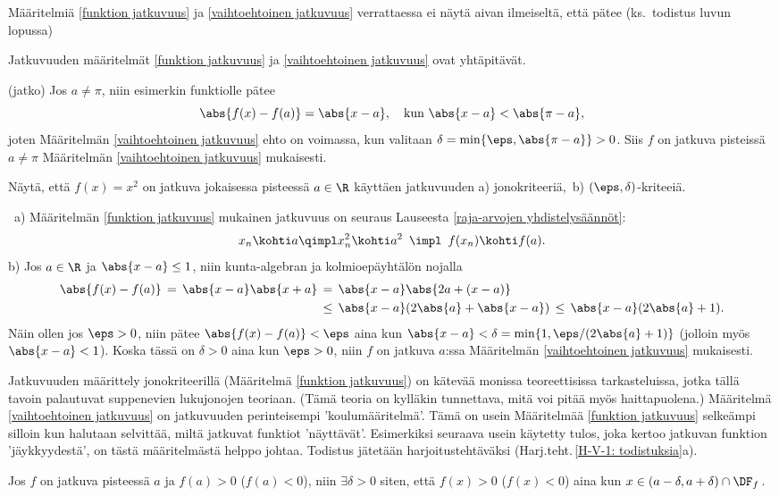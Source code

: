 Määritelmiä \ref{funktion jatkuvuus} ja \ref{vaihtoehtoinen jatkuvuus} verrattaessa ei näytä
aivan ilmeiseltä, että pätee (ks.\ todistus luvun lopussa)
\begin{*Lause} \label{jatkuvuuskriteerien yhtäpitävyys} Jatkuvuuden määritelmät
\ref{funktion jatkuvuus} ja \ref{vaihtoehtoinen jatkuvuus} ovat yhtäpitävät.
\end{*Lause} 
\jatko\jatko \begin{Exa} (jatko) Jos $a\neq\pi$, niin esimerkin funktiolle pätee
\[
\abs{f(x)-f(a)}=\abs{x-a}, \quad \text{kun}\ \abs{x-a}<\abs{\pi-a},
\]
joten Määritelmän \ref{vaihtoehtoinen jatkuvuus} ehto on voimassa, kun valitaan
$\delta=\min\{\eps,\abs{\pi-a}\}>0$. Siis $f$ on jatkuva pisteissä $a\neq\pi$ Määritelmän
\ref{vaihtoehtoinen jatkuvuus} mukaisesti. \loppu
\end{Exa} \seur
\begin{Exa} Näytä, että $f(x)=x^2$ on jatkuva jokaisessa pisteessä $a\in\R$
käyttäen jatkuvuuden a) jonokriteeriä,\, b) $(\eps,\delta)$-kriteeiä.
\end{Exa}
\ratk \ a) Määritelmän \ref{funktion jatkuvuus} mukainen jatkuvuus on seuraus Lauseesta
\ref{raja-arvojen yhdistelysäännöt}:
\[
x_n \kohti a \qimpl x_n^2 \kohti a^2\,\ \impl\,\ f(x_n) \kohti f(a).
\]
b) Jos $a\in\R$ ja $\abs{x-a} \le 1$, niin kunta-algebran ja kolmioepäyhtälön nojalla
\begin{align*}
\abs{f(x)-f(a)}\,=\,\abs{x-a}\abs{x+a}\,
                &=\,\abs{x-a}\abs{2a+(x-a)} \\
                &\le\,\abs{x-a}(2\abs{a}+\abs{x-a})\,
                 \le\,\abs{x-a}(2\abs{a}+1).
\end{align*}
Näin ollen jos $\eps>0$, niin pätee $\abs{f(x)-f(a)}<\eps$ aina kun
$\abs{x-a}<\delta=\min\{1,\eps/(2\abs{a}+1)\}$ (jolloin myös $\abs{x-a}<1$). Koska tässä on
$\delta>0$ aina kun $\eps>0$, niin $f$ on jatkuva $a$:ssa
Määritelmän \ref{vaihtoehtoinen jatkuvuus} mukaisesti. \loppu

Jatkuvuuden määrittely jonokriteerillä (Määritelmä \ref{funktion jatkuvuus}) on kätevää
monissa teoreettisissa tarkasteluissa, jotka tällä tavoin palautuvat suppenevien
lukujonojen teoriaan. (Tämä teoria on kylläkin tunnettava, mitä voi pitää myös
haittapuolena.) Määritelmä \ref{vaihtoehtoinen jatkuvuus} on jatkuvuuden perinteisempi
'koulumääritelmä'. Tämä on usein Määritelmää \ref{funktion jatkuvuus} selkeämpi silloin kun
halutaan selvittää, miltä jatkuvat funktiot 'näyttävät'. Esimerkiksi seuraava usein käytetty
tulos, joka kertoo jatkuvan funktion 'jäykkyydestä', on tästä määritelmästä helppo johtaa.
Todistus jätetään harjoitustehtäväksi (Harj.teht.\,\ref{H-V-1: todistuksia}a).
\begin{Prop} \label{jatkuvan funktion jäykkyys} Jos $f$ on jatkuva pisteessä $a$ ja $f(a)>0$
($f(a)<0$), niin $\exists\delta>0$ siten, että $f(x)>0$ ($f(x)<0$) aina kun 
$x\in(a-\delta,a+\delta) \cap \DF_f\,$.
\end{Prop}

